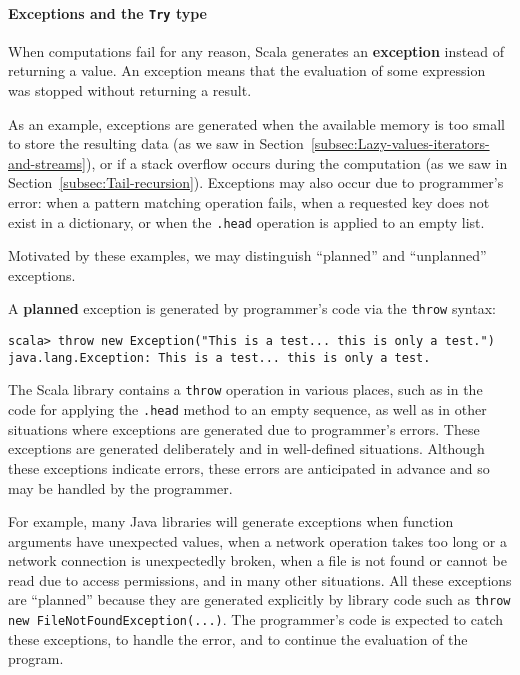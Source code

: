 \paragraph{Exceptions and the \texttt{Try} type}

When computations fail for any reason, Scala generates an \textbf{exception}
instead of returning a value. An exception means that the evaluation
of some expression was stopped without returning a result.

As an example, exceptions are generated when the available memory
is too small to store the resulting data (as we saw in Section~\ref{subsec:Lazy-values-iterators-and-streams}),
or if a stack overflow occurs during the computation (as we saw in
Section~\ref{subsec:Tail-recursion}). Exceptions may also occur
due to programmer's error: when a pattern matching operation fails,
when a requested key does not exist in a dictionary, or when the \lstinline!.head!
operation is applied to an empty list.

Motivated by these examples, we may distinguish ``planned''
and ``unplanned'' exceptions. 

A \textbf{planned} exception is generated by programmer's code via
the \lstinline!throw! syntax:
\begin{lstlisting}
scala> throw new Exception("This is a test... this is only a test.")
java.lang.Exception: This is a test... this is only a test.
\end{lstlisting}
The Scala library contains a \lstinline!throw! operation in various
places, such as in the code for applying the \lstinline!.head! method
to an empty sequence, as well as in other situations where exceptions
are generated due to programmer's errors. These exceptions are generated
deliberately and in well-defined situations. Although these exceptions
indicate errors, these errors are anticipated in advance and so may
be handled by the programmer.

For example, many Java libraries will generate exceptions when function
arguments have unexpected values, when a network operation takes too
long or a network connection is unexpectedly broken, when a file is
not found or cannot be read due to access permissions, and in many
other situations. All these exceptions are ``planned'' because they
are generated explicitly by library code such as \lstinline!throw new FileNotFoundException(...)!.
The programmer's code is expected to catch these exceptions, to handle
the error, and to continue the evaluation of the program.

